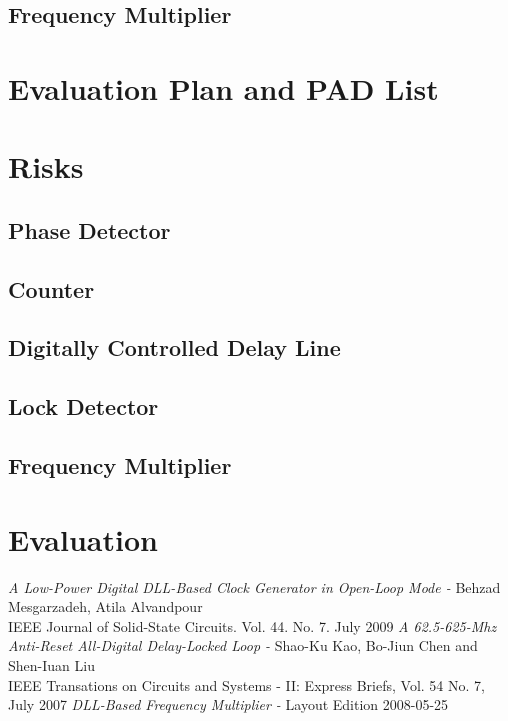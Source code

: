 \documentclass[a4paper,12pt]{article} \usepackage{graphicx}
\begin{document}
\clearpage

\subsection{Frequency Multiplier}

\section{Evaluation Plan and PAD List}

\section{Risks}
\subsection{Phase Detector}
\subsection{Counter}
\subsection{Digitally Controlled Delay Line}
\subsection{Lock Detector}
\subsection{Frequency Multiplier}

\section{Evaluation}

\newpage
\appendix 
\newpage

\begin{thebibliography}{99}
        \textit{A Low-Power Digital DLL-Based Clock Generator in Open-Loop Mode - }
                Behzad Mesgarzadeh, Atila Alvandpour \\
                IEEE Journal of Solid-State Circuits. Vol. 44. No. 7. July 2009
        \textit{A 62.5-625-Mhz Anti-Reset All-Digital Delay-Locked Loop - }
                Shao-Ku Kao, Bo-Jiun Chen and Shen-Iuan Liu \\
                IEEE Transations on Circuits and Systems - II: Express Briefs, Vol. 54 No. 7, July 2007
        \textit{DLL-Based Frequency Multiplier - }
                Layout Edition 2008-05-25 

\end{thebibliography}
\end{document}
